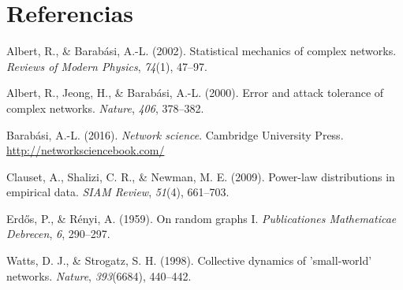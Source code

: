 \documentclass[
  letterpaper,
  DIV=11,
  numbers=noendperiod]{scrreprt}
\newlength{\cslhangindent}
\newenvironment{CSLReferences}[2] %
 {\begin{list}{}{%
  \setlength{\itemindent}{0pt}
  \setlength{\leftmargin}{0pt}
  \setlength{\parsep}{0pt}
  \ifodd #1
   \setlength{\leftmargin}{\cslhangindent}
   \setlength{\itemindent}{-1\cslhangindent}
  \fi
  \setlength{\itemsep}{#2\baselineskip}}}
 {\end{list}}
\begin{document}

\chapter*{Referencias}\label{referencias}


\label{refs}
\begin{CSLReferences}{1}{0}
Albert, R., \& Barabási, A.-L. (2002). Statistical mechanics of complex
networks. \emph{Reviews of Modern Physics}, \emph{74}(1), 47--97.

Albert, R., Jeong, H., \& Barabási, A.-L. (2000). Error and attack
tolerance of complex networks. \emph{Nature}, \emph{406}, 378--382.

Barabási, A.-L. (2016). \emph{Network science}. Cambridge University
Press. \url{http://networksciencebook.com/}

Clauset, A., Shalizi, C. R., \& Newman, M. E. (2009). Power-law
distributions in empirical data. \emph{SIAM Review}, \emph{51}(4),
661--703.

Erdős, P., \& Rényi, A. (1959). On random graphs {I}.
\emph{Publicationes Mathematicae Debrecen}, \emph{6}, 290--297.

Watts, D. J., \& Strogatz, S. H. (1998). Collective dynamics of
'small-world' networks. \emph{Nature}, \emph{393}(6684), 440--442.

\end{CSLReferences}
\end{document}
